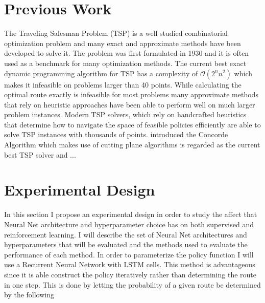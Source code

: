 \documentclass[12pt]{article}
\begin{document}


\section{Previous Work}

The Traveling Salesman Problem (TSP) is a well studied combinatorial optimization problem and many exact and approximate methods have been developed to solve it. The problem was first formulated in 1930 and it is often used as a benchmark for many optimization methods. The current best exact dynamic programming algorithm for TSP has a complexity of $\mathcal{O}(2^nn^2)$ which makes it infeasible on problems larger than 40 points. While calculating the optimal route exactly is infeasible for most problems many approximate methods that rely on heuristic approaches have been able to perform well on much larger problem instances. Modern TSP solvers, which rely on handcrafted heuristics that determine how to navigate the space of feasible policies efficiently are able to solve TSP instances with thousands of points. \citep{2006_concorde} introduced the Concorde Algorithm which makes use of cutting plane algorithms is regarded as the current best TSP solver and ...


\citep{2014_sut}

\citep{2014_Sutskever}

\citep{2015_Vinyals}

\citep{2016_Bello}

\citep{2018_Nazari}

\section{Experimental Design}
In this section I propose an experimental design in order to study the affect that Neural Net architecture and hyperparameter choice has on both supervised and reinforcement learning. I will describe the set of Neural Net architectures and hyperparameters that will be evaluated and the methods used to evaluate the performance of each method. In order to parameterize the policy function I will use a Recurrent Neural Network with LSTM cells. This method is advantageous since it is able construct the policy iteratively rather than determining the route in one step. This is done by letting the probability of a given route be determined by the following
\end{document}
